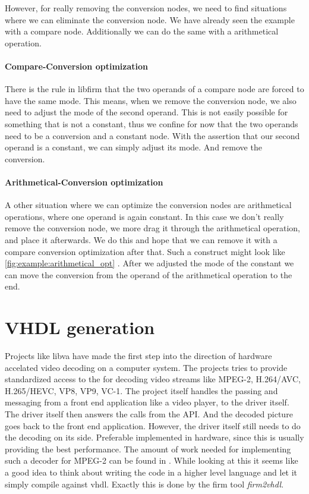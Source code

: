 However, for really removing the conversion nodes, we need to find situations where we can eliminate the conversion node. We have already seen the example with a compare node. Additionally we can do the same with a arithmetical operation.

\paragraph{Compare-Conversion optimization}
There is the rule in libfirm that the two operands of a compare node are forced to have the same mode. This means, when we remove the conversion node, we also need to adjust the mode of the second operand. This is not easily possible for something that is not a constant, thus we confine for now that the two operands need to be a conversion and a constant node.
With the assertion that our second operand is a constant, we can simply adjust its mode. And remove the conversion. 

\paragraph{Arithmetical-Conversion optimization}

A other situation where we can optimize the conversion nodes are arithmetical operations, where one operand is again constant. In this case we don't really remove the conversion node, we more drag it through the arithmetical operation, and place it afterwards. We do this and hope that we can remove it with a compare conversion optimization after that.
Such a construct might look like \autoref{fig:example:arithmetical_opt} . After we adjusted the mode of the constant we can move the conversion from the operand of the arithmetical operation to the end.
\section{VHDL generation}
Projects like libva have made the first step into the direction of hardware accelated video decoding on a computer system. The projects tries to provide standardized access to the for decoding video streams like MPEG-2, H.264/AVC, H.265/HEVC, VP8, VP9, VC-1. The project itself handles the passing and messaging from a front end application like a video player, to the driver itself. The driver itself then answers the calls from the API. And the decoded picture goes back to the front end application. However, the driver itself still needs to do the decoding on its side. Preferable implemented in hardware, since this is usually providing the best performance. The amount of work needed for implementing such a decoder for MPEG-2 can be found in \cite{mpeg2-modelling}. %
While looking at this it seems like a good idea to think about writing the code in a higher level language and let it simply compile against vhdl. Exactly this is done by the firm tool \textit{firm2vhdl}.
